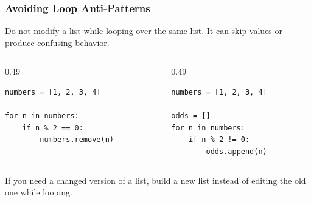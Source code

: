 \documentclass[aspectratio=169,10pt]{beamer}
\begin{document}
\begin{frame}[fragile]
\frametitle{Avoiding Loop Anti-Patterns}
\begin{tcolorbox}[lecturebox,title=Common mistake]
Do not modify a list while looping over the same list. It can skip values or produce confusing behavior.
\end{tcolorbox}

\begin{columns}[T,totalwidth=\textwidth]
\begin{column}{0.49\textwidth}
\begin{tcolorbox}[lecturebox,title=Risky]
\begin{lstlisting}[style=pycodesmall]
numbers = [1, 2, 3, 4]

for n in numbers:
    if n % 2 == 0:
        numbers.remove(n)
\end{lstlisting}
\end{tcolorbox}
\end{column}
\begin{column}{0.49\textwidth}
\begin{tcolorbox}[lecturebox,title=Safer]
\begin{lstlisting}[style=pycodesmall]
numbers = [1, 2, 3, 4]

odds = []
for n in numbers:
    if n % 2 != 0:
        odds.append(n)
\end{lstlisting}
\end{tcolorbox}
\end{column}
\end{columns}

\begin{tcolorbox}[lecturebox,title=Rule of thumb]
If you need a changed version of a list, build a new list instead of editing the old one while looping.
\end{tcolorbox}
\end{frame}
\end{document}
